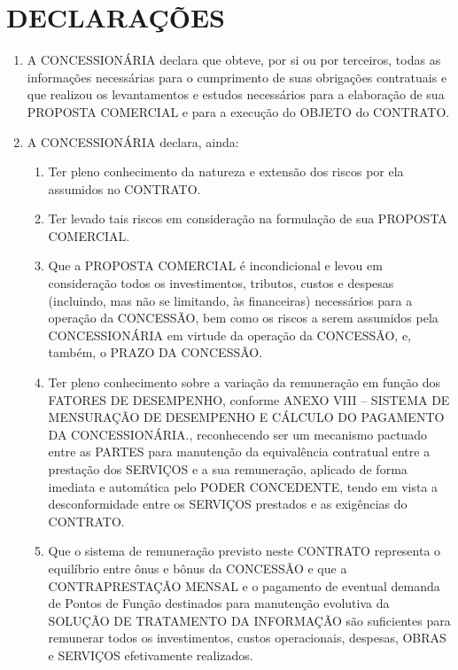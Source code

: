 \documentclass[a4paper,11pt]{report} %
\begin{document}
\section{DECLARAÇÕES}
\label{sec:ZJWC}

\begin{enumerate}
\item \label{itm:YDJ7} A CONCESSIONÁRIA declara que obteve, por si ou por terceiros, todas as informações necessárias para o cumprimento de suas obrigações contratuais e que realizou os levantamentos e estudos necessários para a elaboração de sua PROPOSTA COMERCIAL e para a execução do OBJETO do CONTRATO.

\item \label{itm:DG64} A CONCESSIONÁRIA declara, ainda:

\begin{enumerate}[label*=\arabic*.]
\item \label{itm:JDDR} Ter pleno conhecimento da natureza e extensão dos riscos por ela assumidos no CONTRATO.

\item \label{itm:J95Y} Ter levado tais riscos em consideração na formulação de sua PROPOSTA COMERCIAL.

\item \label{itm:EV92} Que a PROPOSTA COMERCIAL é incondicional e levou em consideração todos os investimentos, tributos, custos e despesas (incluindo, mas não se limitando, às financeiras) necessários para a operação da CONCESSÃO, bem como os riscos a serem assumidos pela CONCESSIONÁRIA em virtude da operação da CONCESSÃO, e, também, o PRAZO DA CONCESSÃO.

\item \label{itm:TU5G} Ter pleno conhecimento sobre a variação da remuneração em função dos FATORES DE DESEMPENHO, conforme ANEXO VIII – SISTEMA DE MENSURAÇÃO DE DESEMPENHO E CÁLCULO DO PAGAMENTO DA CONCESSIONÁRIA., reconhecendo ser um mecanismo pactuado entre as PARTES para manutenção da equivalência contratual entre a prestação dos SERVIÇOS e a sua remuneração, aplicado de forma imediata e automática pelo PODER CONCEDENTE, tendo em vista a desconformidade entre os SERVIÇOS prestados e as exigências do CONTRATO.

\item \label{itm:52D9} Que o sistema de remuneração previsto neste CONTRATO representa o equilíbrio entre ônus e bônus da CONCESSÃO e que a CONTRAPRESTAÇÃO MENSAL e o pagamento de eventual demanda de Pontos de Função destinados para manutenção evolutiva da SOLUÇÃO DE TRATAMENTO DA INFORMAÇÃO são suficientes para remunerar todos os investimentos, custos operacionais, despesas, OBRAS e SERVIÇOS efetivamente realizados.
\end{enumerate}

\end{enumerate}
\end{document}
